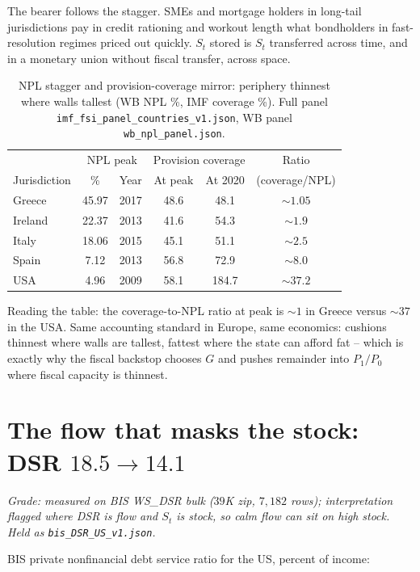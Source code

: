 The bearer follows the stagger. SMEs and mortgage holders in long-tail jurisdictions pay in credit rationing and workout length what bondholders in fast-resolution regimes priced out quickly. $S_t$ stored is $S_t$ transferred across time, and in a monetary union without fiscal transfer, across space.

\begin{table}[h]
\centering
\small
\caption{NPL stagger and provision-coverage mirror: periphery thinnest where walls tallest (WB NPL \%, IMF coverage \%). Full panel \texttt{imf\_fsi\_panel\_countries\_v1.json}, WB panel \texttt{wb\_npl\_panel.json}.}
\label{tab:npl-stagger-full}
\begin{tabular}{lccccc}
\toprule
 & \multicolumn{2}{c}{NPL peak} & \multicolumn{2}{c}{Provision coverage} & Ratio \\
Jurisdiction & \% & Year & At peak & At 2020 & (coverage/NPL) \\
\midrule
Greece & 45.97 & 2017 & 48.6 & 48.1 & $\sim1.05$ \\
Ireland & 22.37 & 2013 & 41.6 & 54.3 & $\sim1.9$ \\
Italy & 18.06 & 2015 & 45.1 & 51.1 & $\sim2.5$ \\
Spain & 7.12 & 2013 & 56.8 & 72.9 & $\sim8.0$ \\
USA & 4.96 & 2009 & 58.1 & 184.7 & $\sim37.2$ \\
\bottomrule
\end{tabular}
\end{table}

Reading the table: the coverage-to-NPL ratio at peak is $\sim1$ in Greece versus $\sim37$ in the USA. Same accounting standard in Europe, same economics: cushions thinnest where walls are tallest, fattest where the state can afford fat -- which is exactly why the fiscal backstop chooses $G$ and pushes remainder into $P_1/P_0$ where fiscal capacity is thinnest.

\section{The flow that masks the stock: DSR $18.5\to14.1$}
\label{sec:dsr}

\textit{Grade: measured on BIS WS\_DSR bulk ($39$K zip, $7{,}182$ rows); interpretation flagged where DSR is flow and $S_t$ is stock, so calm flow can sit on high stock. Held as \texttt{bis\_DSR\_US\_v1.json}.}

BIS private nonfinancial debt service ratio for the US, percent of income:


